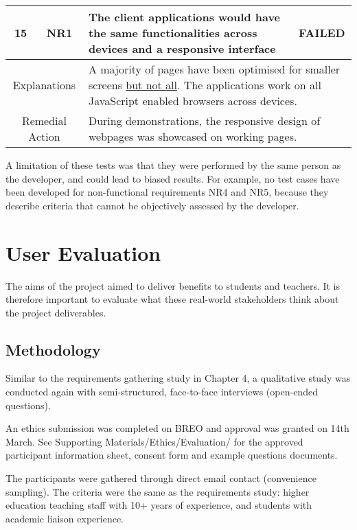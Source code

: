\begin{table}[!ht]	
	\begin{tabularx}{\textwidth}{|c|c|X|c|}
		\hline
		15 & NR1 & \textbf{The client applications would have the same functionalities
		across devices and a responsive interface} & \cellcolor{pink}FAILED \\
		\hline
		\multicolumn{2}{|c|}{Explanations} & \multicolumn{2}{X|}{
			A majority of pages have been optimised for smaller screens \underline{but not all}. 
			The applications work on all JavaScript enabled browsers across devices.
		   }      \\
		\hline
		\multicolumn{2}{|c|}{Remedial Action} & \multicolumn{2}{X|}{During demonstrations, the responsive design of webpages was showcased on working pages.}                                                                                                  \\
		\hline
	\end{tabularx}	
\end{table}

A limitation of these tests was that they were performed by the same person as the developer,
and could lead to biased results.
For example, no test cases have been developed for non-functional requirements NR4 and NR5,
because they describe criteria that cannot be objectively assessed by the developer.

\section{User Evaluation}

The aims of the project aimed to deliver benefits to students and teachers.
It is therefore important to evaluate what these real-world stakeholders think about the project deliverables.

\subsection{Methodology}

Similar to the requirements gathering study in Chapter 4, a qualitative study was conducted
again with semi-structured, face-to-face interviews (open-ended questions).

An ethics submission was completed on BREO and approval was granted on 14th March.
See Supporting Materials/Ethics/Evaluation/ for the approved
participant information sheet, consent form and example questions documents.

The participants were gathered through direct email contact (convenience sampling).
The criteria were the same as the requirements study: higher education teaching staff
with 10+ years of experience, and students with academic liaison experience.

